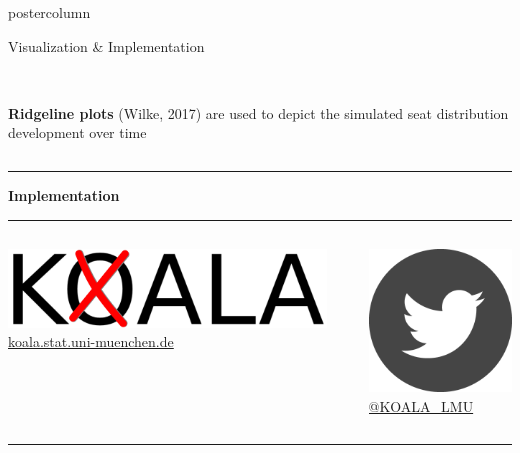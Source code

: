 \documentclass[final,hyperref={pdfpagelabels=false}]{beamer}
\newcommand{\bfBlue}[1]{\textcolor{koaladarkestblue}{\textbf{#1}}}
\newcommand{\blue}[1]{\textcolor{koaladarkestblue}{#1}}
\begin{document}
\begin{frame}
\begin{columns}
\begin{column}{1\textwidth}
\begin{columns}[T]
\begin{column}{.484\textwidth}
\begin{beamercolorbox}[center,wd=\textwidth]{postercolumn}
\begin{minipage}[T]{.95\textwidth}
\begin{block}{\footnotesize Visualization \& Implementation}
\begin{columns}[t]
  \begin{column}{.65\textwidth}
  \ \\
  \textbf{Ridgeline plots} {\footnotesize (Wilke, 2017)} are used to depict the simulated seat distribution development over time
  \end{column}
\end{columns}
\vspace{1ex}
\textcolor{LMUlightgray}{\hrule{}}
\vspace{6ex}
\bfBlue{Implementation}
\\[0.05cm]
\textcolor{LMUlightgray}{\hrule{}}
\vspace{1ex}
\begin{columns}[t]
  \begin{column}{.45\textwidth}
  \begin{center}\centering
  \includegraphics[height=3.5ex]{figures/Koala_Logo_ohneSchrift} \\
  \blue{\footnotesize \href{http://koala.stat.uni-muenchen.de}{koala.stat.uni-muenchen.de}}
  \end{center}
  \end{column}

  \hspace{-1.5ex}
  \textcolor{LMUlightgray}{\vrule{}}
  \hspace{1.5ex}

  \begin{column}{.45\textwidth}
  \begin{center}\centering
  \includegraphics[height=3.5ex]{figures/implementation_twitter} \\
  \blue{\footnotesize \href{https://twitter.com/KOALA_LMU}{@KOALA\_LMU}}
  \end{center}
  \end{column}
\end{columns}
\vspace{1ex}
\textcolor{LMUlightgray}{\hrule{}}
\vspace{3ex}


\end{block}
\end{minipage}
\end{beamercolorbox}
\end{column}
\end{columns}
\end{column}
\end{columns}
\end{frame}
\end{document}
